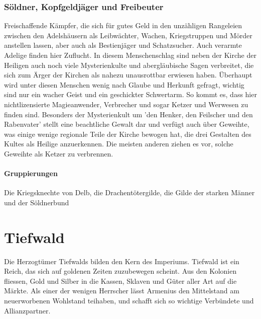 \documentclass[10pt,twoside,twocolumn,openany]{book}
\begin{document}

\subsubsection{Söldner, Kopfgeldjäger und Freibeuter} Freischaffende Kämpfer, die sich für gutes Geld in den unzähligen Rangeleien zwischen den Adelshäusern als Leibwächter, Wachen, Kriegstruppen und Mörder anstellen lassen, aber auch als Bestienjäger und Schatzsucher. Auch verarmte Adelige finden hier Zuflucht. In diesem Menschenschlag sind neben der Kirche der Heiligen auch noch viele Mysterienkulte und abergläubische Sagen verbreitet, die sich zum Ärger der Kirchen als nahezu unausrottbar erwiesen haben. Überhaupt wird unter diesen Menschen wenig nach Glaube und Herkunft gefragt, wichtig sind nur ein wacher Geist und ein geschickter Schwertarm. So kommt es, dass hier nichtlizensierte Magieanwender, Verbrecher und sogar Ketzer und Werwesen zu finden sind.
Besonders der Mysterienkult um 'den Henker, den Feilscher und den Rabenvater' stellt eine beachtliche Gewalt dar und verfügt auch über Geweihte, was einige wenige regionale Teile der Kirche bewogen hat, die drei Gestalten des Kultes als Heilige anzuerkennen. Die meisten anderen ziehen es vor, solche Geweihte als Ketzer zu verbrennen.

\paragraph{Gruppierungen} Die Kriegsknechte von Delb, die Drachentötergilde, die Gilde der starken Männer und der Söldnerbund

\section{Tiefwald}
Die Herzogtümer Tiefwalds bilden den Kern des Imperiums. Tiefwald ist ein Reich, das sich auf goldenen Zeiten zuzubewegen scheint. Aus den Kolonien fliessen, Gold und Silber in die Kassen, Sklaven und Güter aller Art auf die Märkte. Als einer der wenigen Herrscher lässt Armenius den Mittelstand am neuerworbenen Wohlstand teihaben, und schafft sich so wichtige Verbündete und Allianzpartner.
\end{document}
